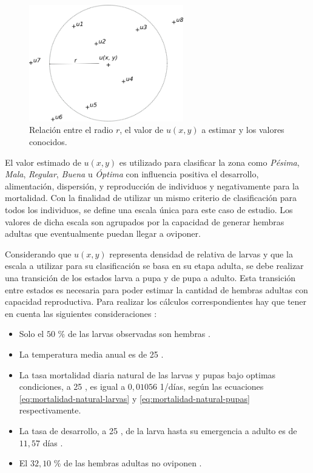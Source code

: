 \begin{figure}[!hptb]
\centering
\includegraphics[width=0.6\textwidth]{capitulo-4/graphics/zonificacion.png}
\caption{\label{fig:cap4-zonficiacion} Relación entre el radio $r$, el valor de $u(x,y)$ a estimar y los valores conocidos.}
\end{figure}

El valor estimado de $u(x,y)$ es utilizado para clasificar la zona como \textit{Pésima},
\textit{Mala}, \textit{Regular}, \textit{Buena} u \textit{Óptima} con influencia positiva el
desarrollo, alimentación, dispersión, y reproducción de individuos y negativamente para la
mortalidad. Con la finalidad de utilizar un mismo criterio de clasificación para todos los
individuos, se define una escala única para este caso de estudio. Los valores de dicha escala son
agrupados por la capacidad de generar hembras adultas que eventualmente puedan llegar a oviponer.

Considerando que $u(x,y)$ representa densidad de relativa de larvas y que la escala a utilizar
para su clasificación se basa en su etapa adulta, se debe realizar una transición de los estados
larva a pupa y de pupa a adulto. Esta transición entre estados es necesaria para poder estimar la
cantidad de hembras adultas con capacidad reproductiva. Para realizar los cálculos
correspondientes hay que tener en cuenta las siguientes consideraciones :

\begin{itemize}
    \item Solo el $50$ \% de las larvas observadas son hembras \cite{otero2006stochastic, manrique1998desarrollo}.
    \item La temperatura media anual es de 25 \textcelsius \cite{website:mspbsHistoria2014}.
    \item La tasa mortalidad diaria natural de las larvas y pupas bajo optimas condiciones, a 25 \textcelsius, es igual a $0,01056$ 1/días, según las ecuaciones \eqref{eq:mortalidad-natural-larvas} y \eqref{eq:mortalidad-natural-pupas} respectivamente.
    \item La tasa de desarrollo, a 25 \textcelsius, de la larva hasta su emergencia a adulto es de $11,57$ días \cite{rueda1990temperature}.
    \item El $32,10$ \% de las hembras adultas no oviponen \cite{osoriopontificia}.
\end{itemize}

